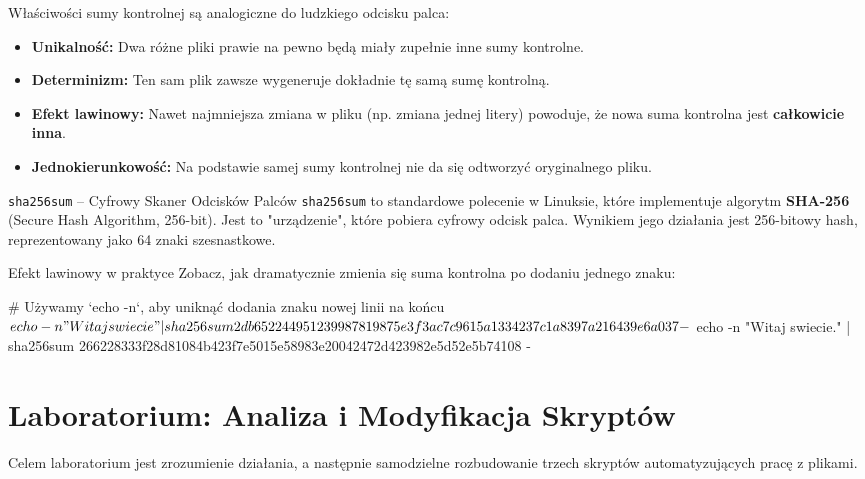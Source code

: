 Właściwości sumy kontrolnej są analogiczne do ludzkiego odcisku palca:
\begin{itemize}
    \item \textbf{Unikalność:} Dwa różne pliki prawie na pewno będą miały zupełnie inne sumy kontrolne.
    \item \textbf{Determinizm:} Ten sam plik zawsze wygeneruje dokładnie tę samą sumę kontrolną.
    \item \textbf{Efekt lawinowy:} Nawet najmniejsza zmiana w pliku (np. zmiana jednej litery) powoduje, że nowa suma kontrolna jest \textbf{całkowicie inna}.
    \item \textbf{Jednokierunkowość:} Na podstawie samej sumy kontrolnej nie da się odtworzyć oryginalnego pliku.
\end{itemize}

\begin{definitionbox}{\texttt{sha256sum} – Cyfrowy Skaner Odcisków Palców}
\texttt{sha256sum} to standardowe polecenie w Linuksie, które implementuje algorytm \textbf{SHA-256} (Secure Hash Algorithm, 256-bit). Jest to "urządzenie", które pobiera cyfrowy odcisk palca. Wynikiem jego działania jest 256-bitowy hash, reprezentowany jako 64 znaki szesnastkowe.
\end{definitionbox}

\begin{importantbox}{Efekt lawinowy w praktyce}
Zobacz, jak dramatycznie zmienia się suma kontrolna po dodaniu jednego znaku:
\begin{terminal}
# Używamy `echo -n`, aby uniknąć dodania znaku nowej linii na końcu
$ echo -n "Witaj swiecie" | sha256sum
2db652244951239987819875e3f3ac7c9615a1334237c1a8397a216439e6a037  -

$ echo -n "Witaj swiecie." | sha256sum
266228333f28d81084b423f7e5015e58983e20042472d423982e5d52e5b74108  -
\end{terminal}
\end{importantbox}

\newpage
\section{Laboratorium: Analiza i Modyfikacja Skryptów}
Celem laboratorium jest zrozumienie działania, a następnie samodzielne rozbudowanie trzech skryptów automatyzujących pracę z plikami.

